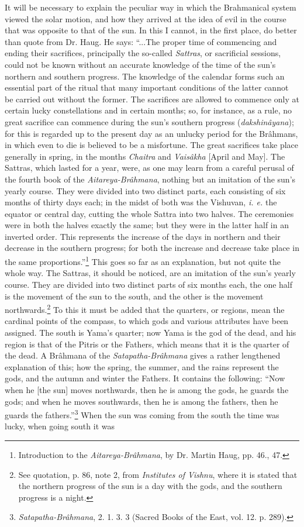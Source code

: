 \documentclass[a4paper, 11pt, oneside, polutonikogreek, english]{article}
\begin{document}
It will be necessary to explain the peculiar way in which the Brahmanical system viewed the solar motion, and how they arrived at the idea of evil in the course that was opposite to that of the sun. In this I cannot, in the first place, do better than quote from Dr. Haug. He says: ``...The proper time of commencing and ending their sacrifices, principally the so-called \emph{Sattras}, or sacrificial sessions, could not be known without an accurate knowledge of the time of the sun's northern and southern progress. The knowledge of the calendar forms such an essential part of the ritual that many important conditions of the latter cannot be carried out without the former. The sacrifices are allowed to commence only at certain lucky constellations and in certain months; so, for instance, as a rule, no great sacrifice can commence during the sun's southern progress (\emph{dakshinâyana}); for this is regarded up to the present day as an unlucky period for the Brâhmans, in which even to die is believed to be a misfortune. The great sacrifices take place generally in spring, in the months \emph{Chaitra} and \emph{Vaisâkha} [April and May]. The Sattras, which lasted for a year, were, as one may learn from a careful perusal of the fourth book of the \emph{Aitareya-Brâhmana}, nothing but an imitation of the sun's yearly course. They were divided into two distinct parts, each consisting of six months of thirty days each; in the midst of both was the Vishuvan, \emph{i. e.} the equator or central day, cutting the whole Sattra into two halves. The ceremonies were in both the halves exactly the same; but they were in the latter half in an inverted order. This represents the increase of the days in northern and their decrease in the southern progress; for both the increase and decrease take place in the same proportions.''\footnote{Introduction to the \emph{Aitareya-Brâhmana}, by Dr. Martin Haug, pp. 46., 47.} This goes so far as an explanation, but not quite the whole way. The Sattras, it should be noticed, are an imitation of the sun's yearly course. They are divided into two distinct parts of six months each, the one half is the movement of the sun to the south, and the other is the movement northwards.\footnote{See quotation, p. 86, note 2, from \emph{Institutes of Vishnu}, where it is stated that the northern progress of the sun is a day with the gods, and the southern progress is a night.} To this it must be added that the quarters, or regions, mean the cardinal points of the compass, to which gods and various attributes have been assigned. The south is Yama's quarter; now Yama is the god of the dead, and his region is that of the Pitris or the Fathers, which means that it is the quarter of the dead. A Brâhmana of the \emph{Satapatha-Brâhmana} gives a rather lengthened explanation of this; how the spring, the summer, and the rains represent the gods, and the autumn and winter the Fathers. It contains the following: ``Now when he [the sun] moves northwards, then he is among the gods, he guards the gods; and when he moves southwards, then he is among the fathers, then he guards the fathers.''\footnote{\emph{Satapatha-Brâhmana}, 2. 1. 3. 3 (Sacred Books of the East, vol. 12. p. 289).} When the sun was coming from the south the time was lucky, when going south it was 
\end{document}
